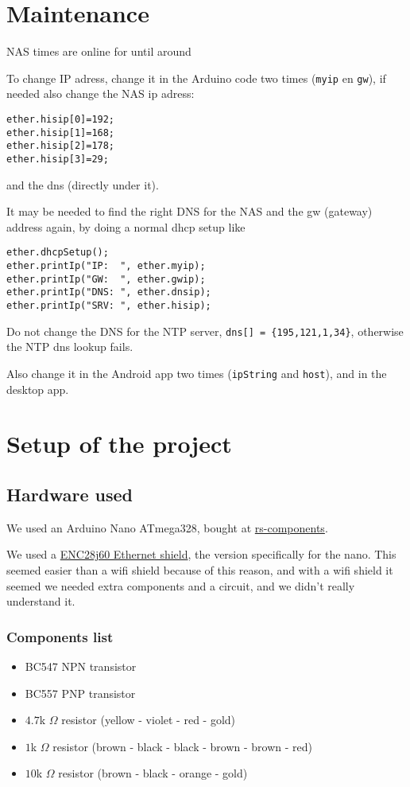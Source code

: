 \documentclass{article}
\begin{document}
	
	\tableofcontents
	\newpage
	
	\section{Maintenance}
		NAS times are online for until around %
		
		To change IP adress, change it in the Arduino code two times (\verb|myip| en \verb|gw|), if needed also change the NAS ip adress:
		\begin{lstlisting}
ether.hisip[0]=192;
ether.hisip[1]=168;
ether.hisip[2]=178;
ether.hisip[3]=29;
		\end{lstlisting}
		and the dns (directly under it).
		
		It may be needed to find the right DNS for the NAS and the gw (gateway) address again, by doing a normal dhcp setup like
		\begin{lstlisting}
ether.dhcpSetup();
ether.printIp("IP:  ", ether.myip);
ether.printIp("GW:  ", ether.gwip);
ether.printIp("DNS: ", ether.dnsip);
ether.printIp("SRV: ", ether.hisip);
		\end{lstlisting}
		Do not change the DNS for the NTP server, \verb|dns[] = {195,121,1,34}|, otherwise the NTP dns lookup fails.
		
		Also change it in the Android app two times (\verb|ipString| and \verb|host|), and in the desktop app.
	
	\section{Setup of the project}
		\subsection{Hardware used}
		We used an Arduino Nano ATmega328, bought at \href{http://nl.rs-online.com/}{rs-components}.
		
		We used a \href{http://www.mijn-gadgets.nl/Webwinkel-Product-157562595/ENC28J60-Ethernet-Shield-Network-Module-V1.0-For-Arduino-Nano.html}{ENC28j60 Ethernet shield}, the version specifically for the nano. This seemed easier than a wifi shield because of this reason, and with a wifi shield it seemed we needed extra components and a circuit, and we didn't really understand it.
		
		\subsubsection{Components list}
			\begin{itemize}
				\item BC547 NPN transistor
				\item BC557 PNP transistor
				\item $4.7$k $\Omega$ resistor (yellow - violet - red - gold)
				\item $1$k $\Omega$ resistor (brown - black - black - brown - brown - red)
				\item $10$k $\Omega$ resistor (brown - black - orange - gold)
			\end{itemize}
	
\end{document}
